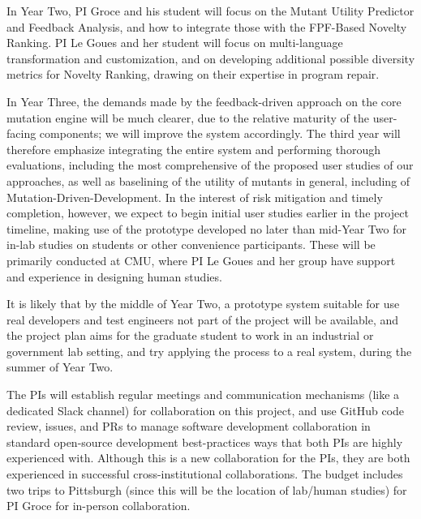 \documentclass[11pt]{article}
\begin{document}
In Year Two, PI Groce and his student will focus on the Mutant Utility Predictor
and Feedback Analysis, and how to integrate those with the FPF-Based Novelty
Ranking.  PI Le Goues and her student will focus on multi-language
transformation and customization, and on developing additional possible
diversity metrics for Novelty Ranking, drawing on their expertise in program
repair.

In Year Three, the demands made by the feedback-driven approach on the core
mutation engine will be much clearer, due to the relative maturity of the
user-facing components; we will improve the system accordingly.  The third year
will therefore emphasize integrating the entire system and performing thorough
evaluations, including the most comprehensive of the proposed user
studies of our approaches, as well as baselining of the utility of mutants in
general, including of Mutation-Driven-Development.
In the interest of risk mitigation and timely completion, however, we expect to
begin initial user studies earlier in the project timeline, making use of the
prototype developed no later than mid-Year Two for in-lab studies on students or
other convenience participants.  These will be primarily conducted at CMU, where
PI Le Goues and her group have support and experience in designing human
studies. 

It is likely that
by the middle of Year Two, a prototype system suitable for use real
developers and test engineers not part of the project will be available, and the
project plan aims for the graduate student to work in an industrial or
government lab setting, and try applying the process to a real system, during
the summer of Year Two.

The PIs will establish regular meetings and communication mechanisms (like a
dedicated Slack channel) for collaboration on this project, and use
GitHub code review, issues, and PRs to manage software development
collaboration in standard open-source development best-practices ways that both
PIs are highly experienced with.  Although this is a
new collaboration for the PIs, they are both experienced in successful
cross-institutional collaborations.  The budget includes two trips to
Pittsburgh (since this will be the location of lab/human studies) for
PI Groce for in-person collaboration.
\end{document}
